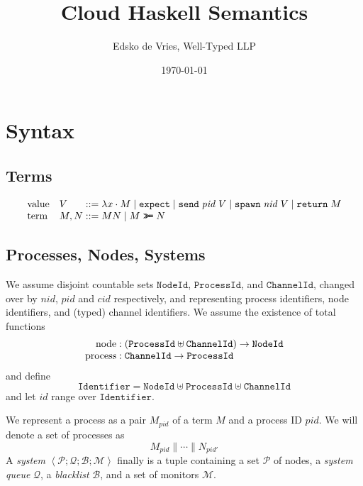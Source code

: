 \documentclass{article}
\newcommand{\sLam}[2]{\lambda {#1} \cdot {#2}}
\newcommand{\sApp}[2]{{#1} {#2}}
\newcommand{\sBind}[2]{{#1} \mathrel{\texttt{>}\!\!\texttt{>}\!\texttt{=}} {#2}}
\newcommand{\sReturn}{\mathtt{return}}
\newcommand{\sExpect}{\mathtt{expect}}
\newcommand{\sSend}{\mathtt{send}}
\newcommand{\sSpawn}{\mathtt{spawn}}
\DeclareMathOperator{\sNodeOf}{node}
\DeclareMathOperator{\sProcessOf}{process}
\newcommand{\sPar}{\mathrel{\parallel}}
\newcommand{\sProc}[2]{{#1}_{#2}}
\newcommand{\sNid}{\ensuremath{\mathit{nid}}}
\newcommand{\sPid}{\ensuremath{\mathit{pid}}}
\newcommand{\sCid}{\ensuremath{\mathit{cid}}}
\newcommand{\sId}{\ensuremath{\mathit{id}}}
\newcommand{\sSystem}[4]{\left\langle #1 ; #2 ; #3 ; #4 \right\rangle}
\newcommand{\sQueue}{\mathcal{Q}}
\newcommand{\sProcesses}{\mathcal{P}}
\newcommand{\sBlacklist}{\mathcal{B}}
\newcommand{\sMonitors}{\mathcal{M}}
\newcommand{\OR}{\mathrel{|}}
\begin{document}
\title{Cloud Haskell Semantics}
\author{Edsko de Vries, Well-Typed LLP}
\date{\today}

\maketitle

\section{Syntax}

\subsection{Terms}

\begin{equation*}
\begin{array}{ll@{\;::=\;}l}
\text{value} & V    & \sLam{x}{M} \OR
                      \sExpect \OR
                      \sSend \; \sPid \; V \OR
                      \sSpawn \; \sNid \; V \OR 
                      \sReturn \; M
\\
\text{term}  & M, N & \sApp{M}{N} \OR
                      \sBind{M}{N}
\end{array}
\end{equation*}

\subsection{Processes, Nodes, Systems}

We assume disjoint countable sets $\mathtt{NodeId}$, $\mathtt{ProcessId}$, and
$\mathtt{ChannelId}$, changed over by \sNid, \sPid{} and \sCid{} respectively,
and representing process identifiers, node identifiers, and (typed) channel
identifiers. We assume the existence of total functions
%
\begin{equation*}
\begin{array}{r@{\;:\;}l}
\sNodeOf    & (\mathtt{ProcessId} \uplus \mathtt{ChannelId}) \rightarrow \mathtt{NodeId} \\
\sProcessOf & \mathtt{ChannelId} \rightarrow \mathtt{ProcessId} 
\end{array}
\end{equation*}
%
and define 
$$\mathtt{Identifier} = \mathtt{NodeId} \uplus \mathtt{ProcessId} \uplus \mathtt{ChannelId}$$ 
and let $\sId$ range over $\mathtt{Identifier}$.

We represent a process as a pair $\sProc{M}{\sPid}$ of a term $M$ and a process
ID $\sPid$. We will denote a set of processes as
%
  $$\sProc{M}{\sPid} \sPar \cdots \sPar \sProc{N}{\sPid'}$$
%
A \emph{system} 
  $\sSystem{\sProcesses}{\sQueue}{\sBlacklist}{\sMonitors}$ 
finally is a tuple containing a set $\sProcesses$ of nodes, a \emph{system
queue} $\sQueue$, a \emph{blacklist} $\sBlacklist$, and a set of monitors
$\sMonitors$.
\end{document}
